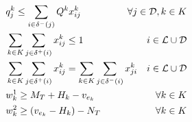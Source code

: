 \documentclass{article}
\begin{document}
\begin{alignat}{3}
    \label{mod:c240}       & q^k_j \leq \sum_{i \in  \delta^{-}(j)}{Q^k x^k_{ij}}                                                                                                                                                                                                                                             & \hspace{-20mm}  \forall j \in \mathcal{D}, k \in K                                               \\
    \label{mod:c25}        & \sum_{k \in K}\sum_{j \in \delta^{+}(i)}{x^{k}_{ij} \leq 1}                                                                                                                                                                                                                                      & i \in \mathcal{L} \cup \mathcal{D}                                                               \\
    \label{mod:c26}        & \sum_{k \in K}\sum_{j \in \delta^{+}(i)} {x^{k}_{ij} } =  \sum_{k \in K}\sum_{j \in \delta^{-}(i)}{x^{k}_{ji} }                                                                                                                                                                                  & i \in \mathcal{L} \cup \mathcal{D}                                                               \\
    \label{mod:c29}        & w^1_k \geq  M_T + H_k - v_{e_k}                                                                                                                                                                                                                                                                  & \hspace{-20mm} \forall k \in K                                                                   \\
    \label{mod:c30}        & w^2_k \geq (v_{e_k} - H_k) - N_T                                                                                                                                                                                                                                                                 & \hspace{-20mm} \forall k \in K                                                                   \\

\end{alignat}
\end{document}
